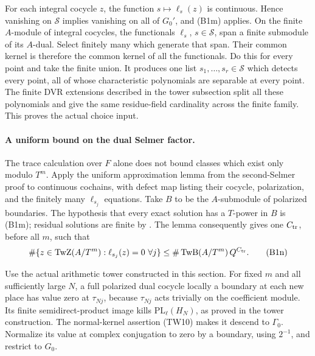For each integral cocycle \(z\), the function
\(s\mapsto\ell_s(z)\) is continuous.
Hence vanishing on \(\mathcal S\) implies vanishing on all
of \(G_0'\), and (B1m) applies.
On the finite \(A\)-module of integral cocycles, the functionals
\(\ell_s\), \(s\in\mathcal S\), span a finite submodule of its
\(A\)-dual.
Select finitely many which generate that span.
Their common kernel is therefore the common kernel of all
the functionals.
Do this for every point and take the finite union.
It produces one list \(s_1,\ldots,s_r\in\mathcal S\) which
detects every point, all of whose characteristic polynomials
are separable at every point.
The finite DVR extensions described in the tower subsection
split all these polynomials and give the same residue-field
cardinality across the finite family.
This proves the actual choice input.

\paragraph{A uniform bound on the dual Selmer factor.}
The trace calculation over \(F\) alone does not bound classes
which exist only modulo \(T^m\).
Apply the uniform approximation lemma from the second-Selmer
proof to continuous cochains, with defect map listing
their cocycle, polarization, and the finitely many
\(\ell_{s_j}\) equations.
Take \(B\) to be the \(A\)-submodule of polarized boundaries.
The hypothesis that every exact solution has a \(T\)-power
in \(B\) is (B1m); residual solutions are finite by
.
The lemma consequently gives one \(C_{\rm tr}\), before all \(m\),
such that
\[
 \#\{z\in\operatorname{TwZ}(A/T^m):
                     \ell_{s_j}(z)=0\ \forall j\}
       \leq \#\operatorname{TwB}(A/T^m)\,Q^{C_{\rm tr}} .
 \tag{B1n}
\]

Use the actual arithmetic tower constructed in this section.
For fixed \(m\) and all sufficiently large \(N\), a full
polarized dual cocycle locally a boundary at each new place
has value zero at \(\tau_{Nj}\), because \(\tau_{Nj}\) acts
trivially on the coefficient module.
Its finite semidirect-product image kills
\(\mathrm{PL}_\ell(H_N)\), as proved in the tower construction.
The normal-kernel assertion (TW10) makes it descend to
\(\Gamma_0\).
Normalize its value at complex conjugation to zero by a
boundary, using \(2^{-1}\), and restrict to \(G_0\).

